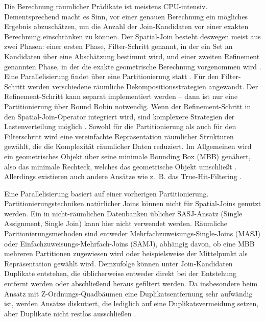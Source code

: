 \documentclass[a4paper,12pt,twoside]{article}
\begin{document}
Die Berechnung räumlicher Prädikate ist meistens CPU-intensiv. Dementsprechend macht es Sinn, vor einer genauen Berechnung ein mögliches Ergebnis abzuschätzen, um die Anzahl der Join-Kandidaten vor einer exakten Berechnung einschränken zu können. Der Spatial-Join besteht deswegen meist aus zwei Phasen: einer ersten Phase, Filter-Schritt genannt, in der ein Set an Kandidaten über eine Abschätzung bestimmt wird, und einer zweiten Refinement genannten Phase, in der die exakte geometrische Berechnung vorgenommen wird \parencite[S. 309f]{Rigaux2001}. Eine Parallelisierung findet über eine Partitionierung statt \parencite{Zhou1998}. Für den Filter-Schritt werden verschiedene räumliche Dekompositionsstrategien angewandt. Der Refinement-Schritt kann separat implementiert werden -- dann ist nur eine Partitionierung über Round Robin notwendig. Wenn der Refinement-Schritt in den Spatial-Join-Operator integriert wird, sind komplexere Strategien der Lastenverteilung möglich \parencite{Brinkhoff1996}. Sowohl für die Partitionierung als auch für den Filterschritt wird eine vereinfachte Repräsentation räumlicher Strukturen gewählt, die die Komplexität räumlicher Daten reduziert. Im Allgemeinen wird ein geometrisches Objekt über seine minimale Bounding Box (MBB) genähert, also das minimale Rechteck, welches das geometrische Objekt umschließt \parencite[S. 202f]{Rigaux2001}. Allerdings existieren auch andere Ansätze wie z.~B. das True-Hit-Filtering \parencite{Bouros2019}.

Eine Parallelisierung basiert auf einer vorherigen Partitionierung. Partitionierungstechniken natürlicher Joins können nicht für Spatial-Joins genutzt werden. Ein in nicht-räumlichen Datenbanken üblicher SASJ-Ansatz (Single Assignment, Single Join) kann hier nicht verwendet werden. Räumliche Paritionierungsmethoden sind entweder Mehrfachzuweisungs-Single-Joins (MASJ) oder Einfachzuweisungs-Mehrfach-Joins (SAMJ), abhängig davon, ob eine MBB mehreren Partitionen zugewiesen wird oder beispielsweise der Mittelpunkt als Repräsentation gewählt wird. Demzufolge können unter Join-Kandidaten Duplikate entstehen, die üblicherweise entweder direkt bei der Entstehung entfernt werden oder abschließend heraus gefiltert werden. Da insbesondere beim Ansatz mit Z-Ordnungs-Quadbäumen eine Duplikatsentfernung sehr aufwändig ist, werden Ansätze diskutiert, die lediglich auf eine Duplikatsvermeidung setzen, aber Duplikate nicht restlos ausschließen \parencite{Jacox2007, Luo2002}. 
\end{document}

